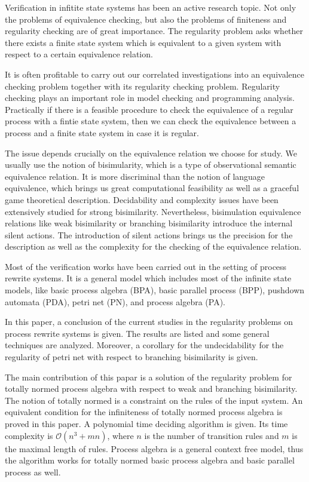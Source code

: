 \begin{englishabstract}

Verification in infitite state systems has been an active research topic. Not only the problems of equivalence checking, but also the problems of finiteness and regularity checking are of great importance. The regularity problem asks whether there exists a finite state system which is equivalent to a given system with respect to a certain equivalence relation. 

It is often profitable to carry out our correlated investigations into an equivalence checking problem together with its regularity checking problem. Regularity checking plays an important role in model checking and programming analysis. Practically if there is a feasible procedure to check the equivalence of a regular process with a fintie state system, then we can check the equivalence between a process and a finite state system in case it is regular.

The issue depends crucially on the equivalence relation we choose for study. We usually use the notion of bisimularity, which is a type of observational semantic equivalence relation. It is more discriminal than the notion of language equivalence, which brings us great computational feasibility as well as a graceful game theoretical description. Decidability and complexity issues have been extensively studied for strong bisimilarity. Nevertheless, bisimulation equivalence relations like weak bisimilarity or branching bisimilarity introduce the internal silent actions. The introduction of silent actions brings us the precision for the description as well as the complexity for the checking of the equivalence relation.

Most of the verification works have been carried out in the setting of process rewrite systems. It is a general model which includes most of the infinite state models, like basic process algebra (BPA), basic parallel process (BPP), pushdown automata (PDA), petri net (PN), and process algebra (PA).

In this paper, a conclusion of the current studies in the regularity problems on process rewrite systems is given. The results are listed and some general techniques are analyzed. Moreover, a corollary for the undecidability for the regularity of petri net with respect to branching bisimilarity is given.

The main contribution of this papar is a solution of the regularity problem for totally normed process algebra with respect to weak and branching bisimilarity. The notion of totally normed is a constraint on the rules of the input system. An equivalent condition for the infiniteness of totally normed process algebra is proved in this paper. A polynomial time deciding algorithm is given. Its time complexity is $\mathscr{O}(n^3+mn)$, where $n$ is the number of transition rules and $m$ is the maximal length of rules. Process algebra is a general context free model, thus the algorithm works for totally normed basic process algebra and basic parallel process as well.


\end{englishabstract}
